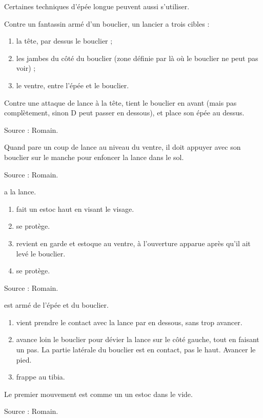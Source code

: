 Certaines techniques d'épée longue peuvent aussi s'utiliser.

Contre un fantassin armé d'un bouclier, un lancier a trois cibles :
\begin{enumerate}
	\item la tête, par dessus le bouclier ;
	\item les jambes du côté du bouclier (zone définie par là où le bouclier ne peut pas voir) ;
	\item le ventre, entre l'épée et le bouclier.
\end{enumerate}


\begin{garde}
Contre une attaque de lance à la tête, \D tient le bouclier en avant (mais pas complètement, sinon D peut passer en dessous), et place son épée au dessus.

Source : Romain.
\end{garde}


\begin{technique}
Quand \D pare un coup de lance au niveau du ventre, il doit appuyer avec son bouclier sur le manche pour enfoncer la lance dans le sol.

Source : Romain.
\end{technique}



\begin{exercice}
\A a la lance.

\begin{enumerate}
	\item \A fait un estoc haut en visant le visage.
	
	\item \D se protège.
	
	\item \A revient en garde et estoque \D au ventre, à l'ouverture apparue après qu'il ait levé le bouclier.
	
	\item \D se protège.
\end{enumerate}

Source : Romain.
\end{exercice}



\begin{technique}
\A est armé de l'épée et du bouclier.

\begin{enumerate}
	\item \A vient prendre le contact avec la lance par en dessous, sans trop avancer.
	
	\item \A avance loin le bouclier pour dévier la lance sur le côté gauche, tout en faisant un pas.
	La partie latérale du bouclier est en contact, pas le haut.
	Avancer le pied.

	\item \A frappe \D au tibia.
\end{enumerate}

Le premier mouvement est comme un un estoc dans le vide.

Source : Romain.
\end{technique}


